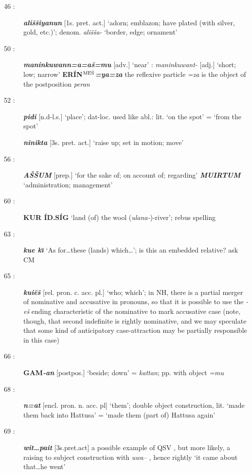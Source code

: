 \documentclass[10pt]{article}
\newcommand{\supersc}[1]{$^{\textrm{\scriptsize{#1}}}$}  	%
\newcommand{\bit}[1]{\textbf{\textit{#1}}}				%
\newcommand{\p}[1]{{\tiny[{#1}]}}					%
\newcommand{\I}{\={\i}}									%
\newcommand{\hith}{\textsubwedge{h}}
\newcommand{\troops}{ER\'IN\supersc{ME\v{S}}}
\renewcommand{\.}[1]{\textsubdot{#1}}
\begin{document}
\begin{description}
\item[46 :] \bit{{\hith}ali\v{s}\v{s}iyanun} \p{1s. pret. act.} `adorn; emblazon; have plated (with silver, gold, etc.)'; denom. \textit{{\hith}ali\v{s}\v{s}a-} `border, edge; ornament'
 
 \item[50 :] \bit{maninkuwann=a=a\v{s}=mu} \p{adv.} `near' : \textit{maninkuwant-} \p{adj.} `short; low; narrow' \textbf{\troops}\bit{=ya=za} the reflexive particle \textit{=za} is the object of the postposition \textit{peran}
 
 \item[52 :] \bit{pidi} \p{n.d-l.s.} `place'; dat-loc. used like abl.: lit. `on the spot' = `from the spot'
 
 \bit{ninikta} \p{3s. pret. act.} `raise up; set in motion; move' 
 
 \item[56 :] \bit{A\v{S}\v{S}UM} \p{prep.} `for the sake of; on account of; regarding' \bit{MUIRTUM} `administration; management'
 
 \item[60 :] \textbf{KUR \'ID.S\'IG} `land (of) the wool (\textit{{\hith}ulana-})-river'; rebus spelling
 
 \item[63 :] \bit{kue k\I} `As for{\ldots}these (lands) which{\ldots}'; {\color{red}is this an embedded relative? ask CM}
 
 \item[65 :] \bit{kui\=e\v{s}} \p{rel. pron. c. acc. pl.} `who; which'; in NH, there is a partial merger of nominative and accusative in pronouns, so that it is possible to use the \textit{-e\v{s}} ending characteristic of the nominative to mark accusative case (note, though, that second indefinite is rightly nominative, and we may speculate that some kind of anticipatory case-attraction may be partially responsible in this case)
 
\item[66 :] \textbf{GAM}\bit{-an} \p{postpos.} `beside; down' = \textit{kattan}; pp. with object \textit{=mu}

\item[68 :] \bit{n=at} \p{encl. pron. n. acc. pl} `them'; double object construction, lit. `made them back into Hattusa' = `made them (part of) Hattusa again'

\item[69 :] \bit{wit{\ldots}pait} \p{3s.pret.act} a possible example of QSV , but more likely, a raising to subject construction with \textit{uwa--} \citep[cf.][]{koller2013restructuring}, hence rightly `it came about that{\ldots}he went'


\end{description}
\end{document}

